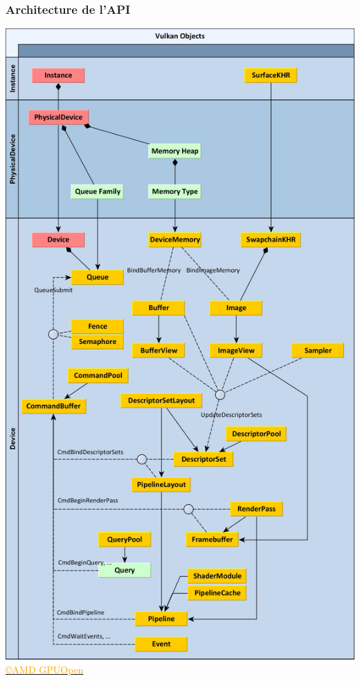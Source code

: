 \documentclass{beamer}
\begin{document}
\begin{frame}[fragile]
\frametitle{Architecture de l'API}

\begin{minipage}{0.335\textwidth}
\includegraphics[height=0.75\textheight]{images/Vulkan-Diagram.png}
\centering\href{https://gpuopen.com/learn/understanding-vulkan-objects/}{\scriptsize \textcolor{orange}{\copyright AMD GPUOpen}}
\end{minipage} 
\begin{minipage}{0.65\textwidth}

\end{minipage}
\end{frame}
\end{document}
